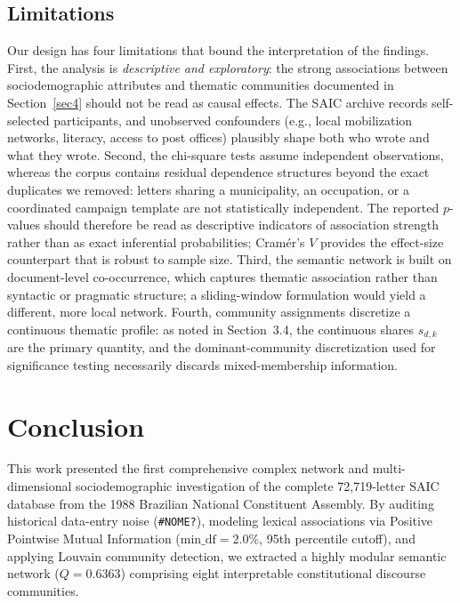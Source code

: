 \documentclass[pdflatex,sn-mathphys,iicol]{sn-jnl}
\begin{document}
\subsection{Limitations}\label{sec:limitations}
Our design has four limitations that bound the interpretation of the findings. First, the analysis is \emph{descriptive and exploratory}: the strong associations between sociodemographic attributes and thematic communities documented in Section~\ref{sec4} should not be read as causal effects. The SAIC archive records self-selected participants, and unobserved confounders (e.g., local mobilization networks, literacy, access to post offices) plausibly shape both who wrote and what they wrote. Second, the chi-square tests assume independent observations, whereas the corpus contains residual dependence structures beyond the exact duplicates we removed: letters sharing a municipality, an occupation, or a coordinated campaign template are not statistically independent. The reported $p$-values should therefore be read as descriptive indicators of association strength rather than as exact inferential probabilities; Cram\'{e}r's $V$ provides the effect-size counterpart that is robust to sample size. Third, the semantic network is built on document-level co-occurrence, which captures thematic association rather than syntactic or pragmatic structure; a sliding-window formulation would yield a different, more local network. Fourth, community assignments discretize a continuous thematic profile: as noted in Section~3.4, the continuous shares $s_{d,k}$ are the primary quantity, and the dominant-community discretization used for significance testing necessarily discards mixed-membership information.

\section{Conclusion}\label{sec5}
This work presented the first comprehensive complex network and multi-dimensional sociodemographic investigation of the complete 72,719-letter SAIC database from the 1988 Brazilian National Constituent Assembly. By auditing historical data-entry noise (\texttt{\#NOME?}), modeling lexical associations via Positive Pointwise Mutual Information ($\text{min\_df}=2.0\%$, 95th percentile cutoff), and applying Louvain community detection, we extracted a highly modular semantic network ($Q=0.6363$) comprising eight interpretable constitutional discourse communities.
\end{document}
